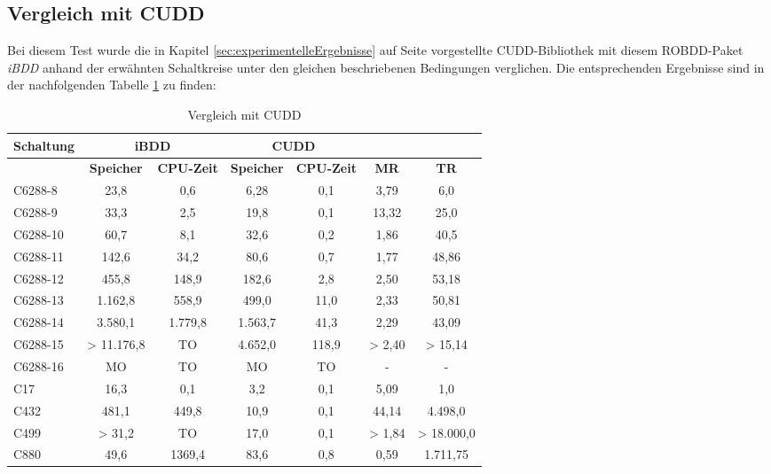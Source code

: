 \subsection{Vergleich mit CUDD}
\label{sec:vglCudd}
Bei diesem Test wurde die in Kapitel \ref{sec:experimentelleErgebnisse} auf Seite \pageref{sec:experimentelleErgebnisse} vorgestellte CUDD-Bibliothek mit diesem ROBDD-Paket \emph{iBDD} anhand der erwähnten Schaltkreise unter den gleichen beschriebenen Bedingungen verglichen. Die entsprechenden Ergebnisse sind in der nachfolgenden Tabelle \ref{tab:vglCudd} zu finden:
\begin{table}[bth]
	\footnotesize
	\centering
	\caption{Vergleich mit CUDD}
	\label{tab:vglCudd}
	\begin{tabular}{ | l | c | c | c | c | c | c |}
		\hline
		\multicolumn{1}{|c|}{\textbf{Schaltung}} & \multicolumn{2}{c|}{\textbf{iBDD}} & \multicolumn{2}{c|}{\textbf{CUDD}} & \multicolumn{2}{c|}{~} \\ \hline
		~ & \multicolumn{1}{c|}{\textbf{Speicher}} & \multicolumn{1}{c|}{\textbf{CPU-Zeit}} & \multicolumn{1}{c|}{\textbf{Speicher}} & \multicolumn{1}{c|}{\textbf{CPU-Zeit}} & \multicolumn{1}{c|}{\textbf{MR}} & \multicolumn{1}{c|}{\textbf{TR}}\\ \hline
		C6288-8 & 23,8 & 0,6 & 6,28 & 0,1 & 3,79 & 6,0 \\ \hline
		C6288-9 & 33,3 & 2,5 & 19,8 & 0,1 & 13,32 & 25,0 \\ \hline
		C6288-10 & 60,7 & 8,1 & 32,6 & 0,2 & 1,86 & 40,5 \\ \hline
		C6288-11 & 142,6 & 34,2 & 80,6 & 0,7 & 1,77 & 48,86 \\ \hline
		C6288-12 & 455,8 & 148,9 & 182,6 & 2,8 & 2,50 & 53,18 \\ \hline
		C6288-13 & 1.162,8 & 558,9 & 499,0 & 11,0 & 2,33 & 50,81 \\ \hline
		C6288-14 & 3.580,1 & 1.779,8 & 1.563,7 & 41,3 & 2,29 & 43,09 \\ \hline
		C6288-15 & > 11.176,8 & TO & 4.652,0 & 118,9 & > 2,40 & > 15,14 \\ \hline
		C6288-16 & MO & TO & MO & TO & - & - \\ \hline
		C17 & 16,3 & 0,1 & 3,2 & 0,1 & 5,09 & 1,0 \\ \hline
		C432 & 481,1 & 449,8 & 10,9 & 0,1 & 44,14 & 4.498,0 \\ \hline
		C499 & > 31,2 & TO & 17,0 & 0,1 & > 1,84 & > 18.000,0 \\ \hline
		C880 & 49,6 & 1369,4 & 83,6 & 0,8 & 0,59 & 1.711,75 \\ \hline

\end{tabular}
\end{table}
